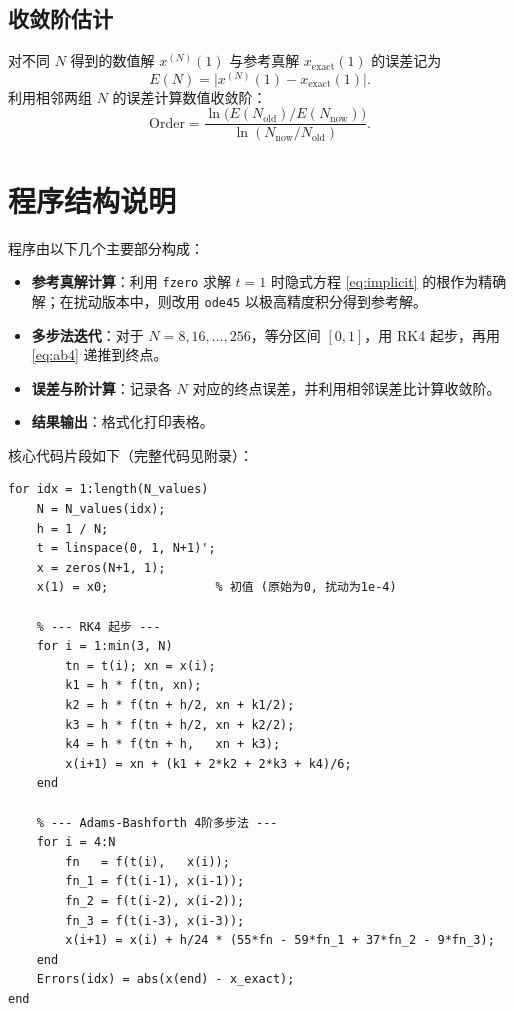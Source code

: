 \documentclass[12pt,a4paper]{article}
\begin{document}
\subsection{收敛阶估计}
对不同 $N$ 得到的数值解 $x^{(N)}(1)$ 与参考真解 $x_{\text{exact}}(1)$ 的误差记为
\[
E(N) = \bigl|x^{(N)}(1) - x_{\text{exact}}(1)\bigr|.
\]
利用相邻两组 $N$ 的误差计算数值收敛阶：
\[
\text{Order} = \frac{\ln\bigl(E(N_{\text{old}})/E(N_{\text{now}})\bigr)}
                     {\ln(N_{\text{now}}/N_{\text{old}})}.
\]

\section{程序结构说明}

程序由以下几个主要部分构成：
\begin{itemize}
    \item \textbf{参考真解计算}：利用 \texttt{fzero} 求解 $t=1$ 时隐式方程 \eqref{eq:implicit} 的根作为精确解；在扰动版本中，则改用 \texttt{ode45} 以极高精度积分得到参考解。
    \item \textbf{多步法迭代}：对于 $N = 8, 16, \dots, 256$，等分区间 $[0,1]$，用 RK4 起步，再用 \eqref{eq:ab4} 递推到终点。
    \item \textbf{误差与阶计算}：记录各 $N$ 对应的终点误差，并利用相邻误差比计算收敛阶。
    \item \textbf{结果输出}：格式化打印表格。
\end{itemize}

核心代码片段如下（完整代码见附录）：

\begin{lstlisting}[caption={Adams-Bashforth 多步法主循环}, label={lst:core}]
for idx = 1:length(N_values)
    N = N_values(idx);
    h = 1 / N;
    t = linspace(0, 1, N+1)';
    x = zeros(N+1, 1);
    x(1) = x0;               % 初值 (原始为0, 扰动为1e-4)

    % --- RK4 起步 ---
    for i = 1:min(3, N)
        tn = t(i); xn = x(i);
        k1 = h * f(tn, xn);
        k2 = h * f(tn + h/2, xn + k1/2);
        k3 = h * f(tn + h/2, xn + k2/2);
        k4 = h * f(tn + h,   xn + k3);
        x(i+1) = xn + (k1 + 2*k2 + 2*k3 + k4)/6;
    end

    % --- Adams-Bashforth 4阶多步法 ---
    for i = 4:N
        fn   = f(t(i),   x(i));
        fn_1 = f(t(i-1), x(i-1));
        fn_2 = f(t(i-2), x(i-2));
        fn_3 = f(t(i-3), x(i-3));
        x(i+1) = x(i) + h/24 * (55*fn - 59*fn_1 + 37*fn_2 - 9*fn_3);
    end
    Errors(idx) = abs(x(end) - x_exact);
end
\end{lstlisting}
\end{document}
